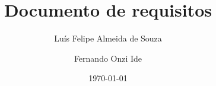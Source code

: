 \documentclass[11pt,a4paper]{report}
\title{Documento de requisitos}
\author{Luís Felipe Almeida de Souza \and Fernando Onzi Ide}
\date{\today}
\begin{document}
\maketitle








\nocite{*}


\end{document}
